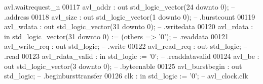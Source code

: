 \begin{DoxyCode}
{       avl.waitrequest\_n}
00117         avl\_addr            : \textcolor{keywordflow}{out} \textcolor{comment}{std\_logic\_vector}(\textcolor{vhdllogic}{}\textcolor{vhdllogic}{24} \textcolor{keywordflow}{downto} \textcolor{vhdllogic}{}\textcolor{vhdllogic}{0});                    \textcolor{keyword}{--          .address}
00118         avl\_size            : \textcolor{keywordflow}{out} \textcolor{comment}{std\_logic\_vector}(\textcolor{vhdllogic}{}\textcolor{vhdllogic}{1} \textcolor{keywordflow}{downto} \textcolor{vhdllogic}{}\textcolor{vhdllogic}{0});                     \textcolor{keyword}{--          .burstcount}
00119         avl\_wdata           : \textcolor{keywordflow}{out} \textcolor{comment}{std\_logic\_vector}(\textcolor{vhdllogic}{}\textcolor{vhdllogic}{31} \textcolor{keywordflow}{downto} \textcolor{vhdllogic}{}\textcolor{vhdllogic}{0});                    \textcolor{keyword}{--          .writedata}
00120         avl\_rdata           : \textcolor{keywordflow}{in}  \textcolor{comment}{std\_logic\_vector}(\textcolor{vhdllogic}{}\textcolor{vhdllogic}{31} \textcolor{keywordflow}{downto} \textcolor{vhdllogic}{}\textcolor{vhdllogic}{0}) := (\textcolor{keywordflow}{others} => '\textcolor{vhdllogic}{}\textcolor{vhdllogic}{0}'); \textcolor{keyword}{--          .readdata}
00121         avl\_write\_req       : \textcolor{keywordflow}{out} \textcolor{comment}{std\_logic};                                        \textcolor{keyword}{--          .write}
00122         avl\_read\_req        : \textcolor{keywordflow}{out} \textcolor{comment}{std\_logic};                                        \textcolor{keyword}{--          .read}
00123         avl\_rdata\_valid     : \textcolor{keywordflow}{in}  \textcolor{comment}{std\_logic}                     := '\textcolor{vhdllogic}{}\textcolor{vhdllogic}{0}';             \textcolor{keyword}{--         
       .readdatavalid}
00124         avl\_be              : \textcolor{keywordflow}{out} \textcolor{comment}{std\_logic\_vector}(\textcolor{vhdllogic}{}\textcolor{vhdllogic}{3} \textcolor{keywordflow}{downto} \textcolor{vhdllogic}{}\textcolor{vhdllogic}{0});                     \textcolor{keyword}{--          .byteenable}
00125         avl\_burstbegin      : \textcolor{keywordflow}{out} \textcolor{comment}{std\_logic};                                        \textcolor{keyword}{--         
       .beginbursttransfer}
00126         clk                 : \textcolor{keywordflow}{in}  \textcolor{comment}{std\_logic}                     := '\textcolor{vhdllogic}{}\textcolor{vhdllogic}{0}';             \textcolor{keyword}{-- avl\_clock.clk}

\end{DoxyCode}
